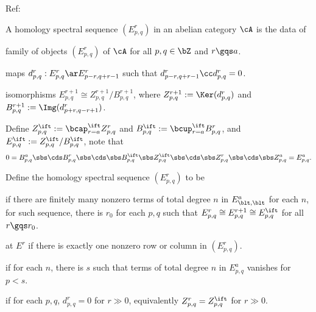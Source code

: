 \documentclass[article, a4paper, twoside]{universal}
\begin{document}
\confighead{}{}{}

Ref:~\cite{Weibel1994}


\begin{dfn}[5.2.1, 5.2.8]
    A homology spectral sequence $(E_{p,q}^{r}) $ in an abelian category $\cA$ is the data of
    \begin{itm}
        \item family of objects $(E_{p,q}^{r})$ of $\cA$ for all $p,q\in\bZ$ and $r\gqs a$.
        \item maps $d_{p,q}^{r}:E_{p,q}^{r}\ar E_{p-r,q+r-1}^{r}$ such that $d_{p-r,q+r-1}^{r}\cc d_{p,q}^{r}=0$.
        \item isomorphisms $E_{p,q}^{r+1}\cong Z_{p,q}^{r+1}/B_{p,q}^{r+1}$, where $Z_{p,q}^{r+1}:=\Ker(d_{p,q}^{r})$ and $B_{p,q}^{r+1}:=\Img(d_{p+r,q-r+1}^{r})$.
    \end{itm}
    Define $Z_{p,q}^{\ift}:=\bcap_{r=a}^{\ift}Z_{p,q}^{r}$ and $B_{p,q}^{\ift}:=\bcup_{r=a}^{\ift}B_{p,q}^{r}$, and $E_{p,q}^{\ift}:=Z_{p,q}^{\ift}/B_{p,q}^{\ift}$, note that
    \[
        0=B_{p,q}^{a}\sbs\cds B_{p,q}^{r}\sbs\cds\sbs B_{p,q}^{\ift}\sbs Z_{p,q}^{\ift}\sbs\cds\sbs Z_{p,q}^{r}\sbs\cds\sbs Z_{p,q}^{a}=E_{p,q}^{a}.
    \]
\end{dfn}

\begin{dfn}[5.2.5, 5.2.7, 5.2.9, 5.2.10]
    Define the homology spectral sequence $(E_{p,q}^{r})$ to be
    \begin{itm}
        \item {} if there are finitely many nonzero terms of total degree $n$ in $E_{\blt,\blt}^{a}$ for each $n$, for such sequence, there is $r_{0}$ for each $p,q$ such that $E_{p,q}^{r}\cong E_{p,q}^{r+1}\cong E_{p,q}^{\ift}$ for all $r\gqs r_{0}$.
        \item {} at $E^{r}$ if there is exactly one nonzero row or column in $(E_{p,q}^{r})$.
        \item {} if for each $n$, there is $s$ such that terms of total degree $n$ in $E_{p,q}^{a}$ vanishes for $p<s$.
        \item {} if for each $p,q$, $d_{p,q}^{r}=0$ for $r\gg 0$, equivalently $Z_{p,q}^{r}=Z_{p,q}^{\ift}$ for $r\gg 0$.
    \end{itm}
\end{dfn}
\end{document}
